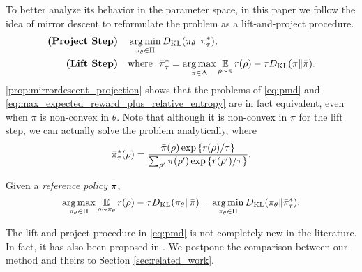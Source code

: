 To better analyze its behavior in the parameter space, in this paper we follow the idea of mirror descent to reformulate the problem as a lift-and-project procedure.
\begin{equation}
\label{eq:pmd}
\begin{split}
\text{\bf (Project Step)} \quad &\operatorname*{arg\,min}\limits_{\pi_\theta \in \Pi}{D_{\mathrm{KL}}( \pi_\theta \| \bar{\pi}_{\tau}^* )}, \\
\text{\bf (Lift Step)}  \quad & \text{where}\ \ \bar{\pi}_{\tau}^* =  \operatorname*{arg\,max}\limits_{\pi \in \Delta}{ \operatorname*{\mathbb{E}}\limits_{\rho \sim \pi}{  r(\rho)  - \tau D_{\mathrm{KL}}(\pi \| \bar{\pi}) } }. 
\end{split}
\end{equation}
\cref{prop:mirrordescent_projection} shows that the problems of \cref{eq:pmd} and \cref{eq:max_expected_reward_plus_relative_entropy} are in fact equivalent, even when $\pi$ is non-convex in $\theta$.
Note that although it is non-convex in $\pi$ for the lift step, we can actually solve the problem analytically, where
\begin{equation}
\label{eq:pitaustar}
\bar{\pi}_\tau^*(\rho) =  \frac{\bar{\pi}(\rho) \exp\left\{ r(\rho) / \tau \right\}}{ \sum_{\rho^{\prime}}{\bar{\pi}(\rho^{\prime}) \exp\left\{ r(\rho^{\prime}) / \tau \right\} } }.
\end{equation}
\begin{prop}
\label{prop:mirrordescent_projection}
Given a \emph{reference policy} $\bar{\pi}$,
\[
 \operatorname*{arg\,max}\limits_{\pi_\theta \in \Pi} { \operatorname*{\mathbb{E}}\limits_{\rho \sim \pi_\theta}{  r(\rho)  - \tau D_{\mathrm{KL}}(\pi_\theta \| \bar{\pi}) } } 
 = \operatorname*{arg\,min}\limits_{\pi_\theta \in \Pi}{ D_{\mathrm{KL}}(\pi_\theta \| \bar{\pi}_\tau^*) }.
\]
\end{prop}
\begin{remk}
	The lift-and-project procedure in \cref{eq:pmd} is not completely new in the literature. In fact, it has also been proposed in \cite{montgomery2016guided,tangkaratt2017guide,abdolmaleki2018maximum,haarnoja2018soft}. We postpone the comparison between our method and theirs to Section \cref{sec:related_work}.
\end{remk}

